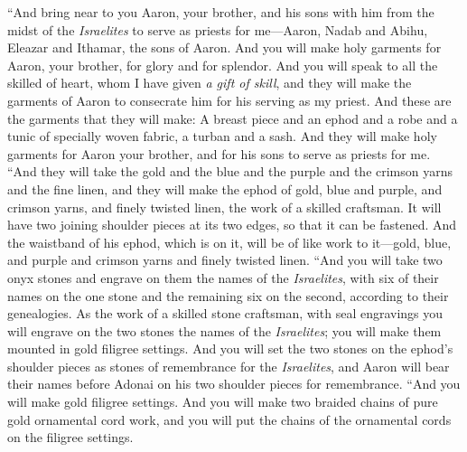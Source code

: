 \begin{biblechapter} %
 “And bring near to you Aaron, your brother, and his sons with him from the midst of the \textit{Israelites} to serve as priests for me—Aaron, Nadab and Abihu, Eleazar and Ithamar, the sons of Aaron.
\verse And you will make holy garments for Aaron, your brother, for glory and for splendor.
\verse And you will speak to all the skilled of heart, whom I have given \textit{a gift of skill}, and they will make the garments of Aaron to consecrate him for his serving as my priest.
\verse And these are the garments that they will make: A breast piece and an ephod and a robe and a tunic of specially woven fabric, a turban and a sash. And they will make holy garments for Aaron your brother, and for his sons to serve as priests for me.
\verse “And they will take the gold and the blue and the purple and the crimson yarns and the fine linen,
\verse and they will make the ephod of gold, blue and purple, and crimson yarns, and finely twisted linen, the work of a skilled craftsman.
\verse It will have two joining shoulder pieces at its two edges, so that it can be fastened.
\verse And the waistband of his ephod, which is on it, will be of like work to it—gold, blue, and purple and crimson yarns and finely twisted linen.
\verse “And you will take two onyx stones and engrave on them the names of the \textit{Israelites},
\verse with six of their names on the one stone and the remaining six on the second, according to their genealogies.
\verse As the work of a skilled stone craftsman, with seal engravings you will engrave on the two stones the names of the \textit{Israelites}; you will make them mounted in gold filigree settings.
\verse And you will set the two stones on the ephod’s shoulder pieces as stones of remembrance for the \textit{Israelites}, and Aaron will bear their names before Adonai on his two shoulder pieces for remembrance.
\verse “And you will make gold filigree settings.
\verse And you will make two braided chains of pure gold ornamental cord work, and you will put the chains of the ornamental cords on the filigree settings.

\end{biblechapter}
